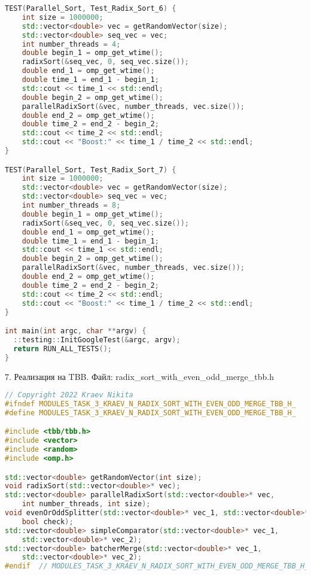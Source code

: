 \documentclass{report}
\begin{document}
\begin{lstlisting}[language=C++]
TEST(Parallel_Sort, Test_Radix_Sort_6) {
    int size = 1000000;
    std::vector<double> vec = getRandomVector(size);
    std::vector<double> seq_vec = vec;
    int number_threads = 4;
    double begin_1 = omp_get_wtime();
    radixSort(&seq_vec, 0, seq_vec.size());
    double end_1 = omp_get_wtime();
    double time_1 = end_1 - begin_1;
    std::cout << time_1 << std::endl;
    double begin_2 = omp_get_wtime();
    parallelRadixSort(&vec, number_threads, vec.size());
    double end_2 = omp_get_wtime();
    double time_2 = end_2 - begin_2;
    std::cout << time_2 << std::endl;
    std::cout << "Boost:" << time_1 / time_2 << std::endl;
}

TEST(Parallel_Sort, Test_Radix_Sort_7) {
    int size = 1000000;
    std::vector<double> vec = getRandomVector(size);
    std::vector<double> seq_vec = vec;
    int number_threads = 8;
    double begin_1 = omp_get_wtime();
    radixSort(&seq_vec, 0, seq_vec.size());
    double end_1 = omp_get_wtime();
    double time_1 = end_1 - begin_1;
    std::cout << time_1 << std::endl;
    double begin_2 = omp_get_wtime();
    parallelRadixSort(&vec, number_threads, vec.size());
    double end_2 = omp_get_wtime();
    double time_2 = end_2 - begin_2;
    std::cout << time_2 << std::endl;
    std::cout << "Boost:" << time_1 / time_2 << std::endl;
}

int main(int argc, char **argv) {
  ::testing::InitGoogleTest(&argc, argv);
  return RUN_ALL_TESTS();
}
\end{lstlisting}

\par 7. Реализация на TBB. Файл: radix\_sort\_with\_even\_odd\_merge\_tbb.h

\begin{lstlisting}[language=C++]
// Copyright 2022 Kraev Nikita
#ifndef MODULES_TASK_3_KRAEV_N_RADIX_SORT_WITH_EVEN_ODD_MERGE_TBB_H_
#define MODULES_TASK_3_KRAEV_N_RADIX_SORT_WITH_EVEN_ODD_MERGE_TBB_H_

#include <tbb/tbb.h>
#include <vector>
#include <random>
#include <omp.h>

std::vector<double> getRandomVector(int size);
void radixSort(std::vector<double>* vec);
std::vector<double> parallelRadixSort(std::vector<double>* vec,
    int number_threads, int size);
void evenOrOddSplitter(std::vector<double>* vec_1, std::vector<double>* vec_2,
    bool check);
std::vector<double> simpleComparator(std::vector<double>* vec_1,
    std::vector<double>* vec_2);
std::vector<double> batcherMerge(std::vector<double>* vec_1,
    std::vector<double>* vec_2);
#endif  // MODULES_TASK_3_KRAEV_N_RADIX_SORT_WITH_EVEN_ODD_MERGE_TBB_H_
\end{lstlisting}
\end{document}
